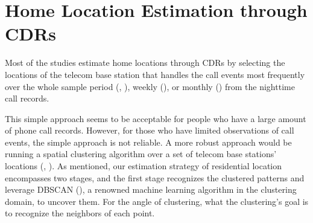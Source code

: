 \section{Home Location Estimation through CDRs}


Most of the studies estimate home locations through CDRs by selecting the locations of the telecom base station that handles the call events most frequently over the whole sample period (\cite{cho2011friendship}, \cite{phithakkitnukoon2012socio}), weekly (\cite{referral_effect_2023aer}), or monthly (\cite{phithakkitnukoon2022inferring}) from the nighttime call records.


This simple approach seems to be acceptable for people who have a large amount of phone call records. However, for those who have limited observations of call events, the simple approach is not reliable. A more robust approach would be running a spatial clustering algorithm over a set of telecom base stations' locations (\cite{isaacman2011identifying}, \cite{yang2014identifying}). As mentioned, our estimation strategy of residential location encompasses two stages, and the first stage recognizes the clustered patterns and leverage DBSCAN (\cite{ester1996density}), a renowned machine learning algorithm in the clustering domain, to uncover them. For the angle of clustering, what the clustering's goal is to recognize the neighbors of each point.


